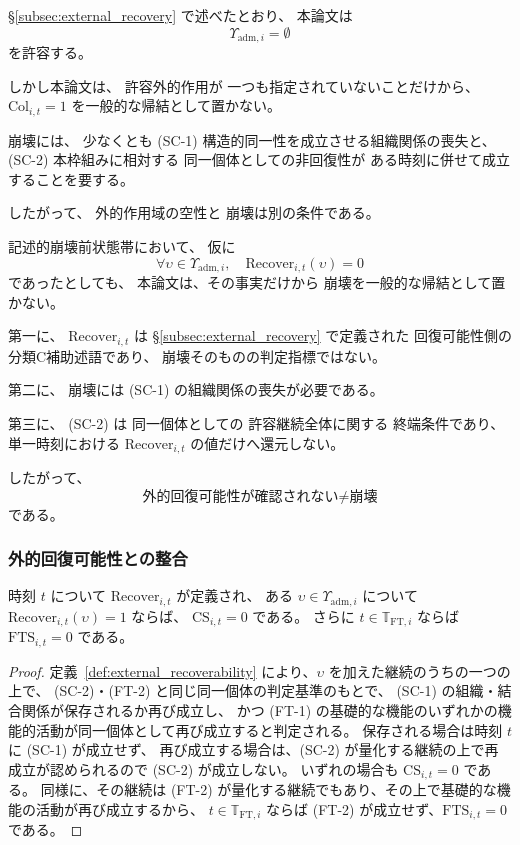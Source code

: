 \begin{remark}[$\Upsilon_{\mathrm{adm}}=\emptyset$ と崩壊の関係]
\label{rem:empty_Xi_not_collapse}
\S\ref{subsec:external_recovery} で述べたとおり、
本論文は
\[
  \Upsilon_{\mathrm{adm},i}=\emptyset
\]
を許容する。

しかし本論文は、
許容外的作用が
一つも指定されていないことだけから、
$\mathrm{Col}_{i,t}=1$
を一般的な帰結として置かない。

崩壊には、
少なくとも
(SC-1) 構造的同一性を成立させる組織関係の喪失と、
(SC-2) 本枠組みに相対する
同一個体としての非回復性が
ある時刻に併せて成立することを要する。

したがって、
外的作用域の空性と
崩壊は別の条件である。
\end{remark}

\begin{remark}[$\mathrm{Recover}=0$ の全称と崩壊の関係]
\label{rem:all_recover_zero_not_collapse}
記述的崩壊前状態帯において、
仮に
\[
  \forall\upsilon\in\Upsilon_{\mathrm{adm},i},
  \quad
  \mathrm{Recover}_{i,t}(\upsilon)=0
\]
であったとしても、
本論文は、その事実だけから
崩壊を一般的な帰結として置かない。

第一に、
$\mathrm{Recover}_{i,t}$
は
\S\ref{subsec:external_recovery}
で定義された
回復可能性側の分類C補助述語であり、
崩壊そのものの判定指標ではない。

第二に、
崩壊には
(SC-1) の組織関係の喪失が必要である。

第三に、
(SC-2) は
同一個体としての
許容継続全体に関する
終端条件であり、
単一時刻における
$\mathrm{Recover}_{i,t}$
の値だけへ還元しない。

したがって、
\[
  \text{外的回復可能性が確認されない}
  \neq
  \text{崩壊}
\]
である。
\end{remark}

\subsubsection{外的回復可能性との整合}

\begin{proposition}[外的回復可能性と終端状態指標]
\label{prop:recover_excludes_termination}
時刻 $t$ について $\mathrm{Recover}_{i,t}$ が定義され、
ある $\upsilon\in\Upsilon_{\mathrm{adm},i}$ について
$\mathrm{Recover}_{i,t}(\upsilon)=1$ ならば、
$\mathrm{CS}_{i,t}=0$ である。
さらに $t\in\mathbb{T}_{\mathrm{FT},i}$ ならば $\mathrm{FTS}_{i,t}=0$ である。
\end{proposition}

\begin{proof}
定義~\ref{def:external_recoverability} により、$\upsilon$ を加えた継続のうちの一つの上で、
(SC-2)・(FT-2) と同じ同一個体の判定基準のもとで、
(SC-1) の組織・結合関係が保存されるか再び成立し、
かつ (FT-1) の基礎的な機能のいずれかの機能的活動が同一個体として再び成立すると判定される。
保存される場合は時刻 $t$ に (SC-1) が成立せず、
再び成立する場合は、(SC-2) が量化する継続の上で再成立が認められるので (SC-2) が成立しない。
いずれの場合も $\mathrm{CS}_{i,t}=0$ である。
同様に、その継続は (FT-2) が量化する継続でもあり、その上で基礎的な機能の活動が再び成立するから、
$t\in\mathbb{T}_{\mathrm{FT},i}$ ならば (FT-2) が成立せず、$\mathrm{FTS}_{i,t}=0$ である。
\end{proof}

